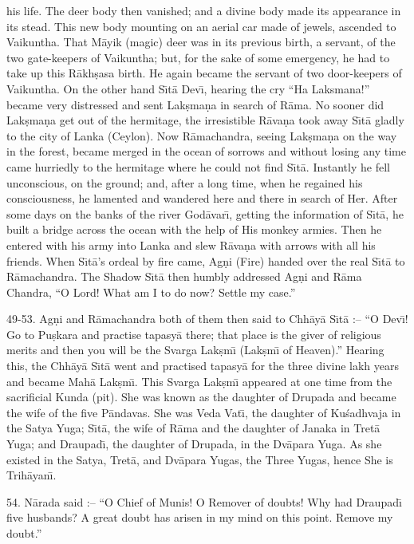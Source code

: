 his life. The deer body then vanished; and a divine body made its appearance in its stead. This new body mounting on an aerial car made of jewels, ascended to Vaikuntha. That M\=ayik (magic) deer was in its previous birth, a servant, of the two gate-keepers of Vaikuntha; but, for the sake of some emergency, he had to take up this R\=akh\d{s}asa birth. He again became the servant of two door-keepers of Vaikuntha. On the other hand S\={\i}t\=a Dev\={\i}, hearing the cry ``Ha Laksmana!'' became very distressed and sent Lak\d{s}ma\d{n}a in search of R\=ama. No sooner did Lak\d{s}ma\d{n}a get out of the hermitage, the irresistible R\=ava\d{n}a took away S\={\i}t\=a gladly to the city of Lanka (Ceylon). Now R\=amachandra, seeing Lak\d{s}ma\d{n}a on the way in the forest, became merged in the ocean of sorrows and without losing any time came hurriedly to the hermitage where he could not find S\={\i}t\=a. Instantly he fell unconscious, on the ground; and, after a long time, when he regained his consciousness, he lamented and wandered here and there in search of Her. After some days on the banks of the river God\=avar\={\i}, getting the information of S\={\i}t\=a, he built a bridge across the ocean with the help of His monkey armies. Then he entered with his army into Lanka and slew R\=ava\d{n}a with arrows with all his friends. When S\={\i}t\=a's ordeal by fire came, Ag\d{n}i (Fire) handed over the real S\={\i}t\=a to R\=amachandra. The Shadow S\={\i}t\=a then humbly addressed Ag\d{n}i and R\=ama Chandra, ``O Lord! What am I to do now? Settle my case.''

49-53. Ag\d{n}i and R\=amachandra both of them then said to Chh\=ay\=a S\={\i}t\=a :-- ``O Dev\={\i}! Go to Pu\d{s}kara and practise tapasy\=a there; that place is the giver of religious merits and then you will be the Svarga Lak\d{s}m\={\i} (Lak\d{s}m\={\i} of Heaven).'' Hearing this, the Chh\=ay\=a S\={\i}t\=a went and practised tapasy\=a for the three divine lakh years and became Mah\=a Lak\d{s}m\={\i}. This Svarga Lak\d{s}m\={\i} appeared at one time from the sacrificial Kunda (pit). She was known as the daughter of Drupada and became the wife of the five P\=andavas. She was Veda Vat\={\i}, the daughter of Ku\'sadhvaja in the Satya Yuga; S\={\i}t\=a, the wife of R\=ama and the daughter of Janaka in Tret\=a Yuga; and Draupad\={\i}, the daughter of Drupada, in the Dv\=apara Yuga. As she existed in the Satya, Tret\=a, and Dv\=apara Yugas, the Three Yugas, hence She is Trih\=ayan\={\i}.

54. N\=arada said :-- ``O Chief of Munis! O Remover of doubts! Why had Draupad\={\i} five husbands? A great doubt has arisen in my mind on this point. Remove my doubt.''

